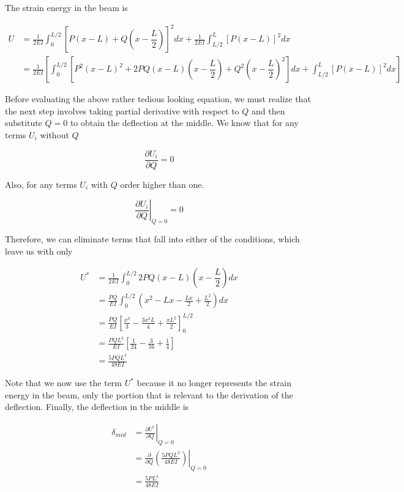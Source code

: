 \documentclass[
fontsize=10pt,
a4paper,
twosides=false,
open=any,
svgnames,
]{kaobook} %
\begin{document}
\begin{example}
    The strain energy in the beam is

    \begin{align*}
      U &= \frac{1}{2EI} \int_0^{L/2} \left[ P(x - L) + Q(x - \dfrac{L}{2}) \right]^2dx + \frac{1}{2EI} \int_{L/2}^L \left[ P(x-L) \right]^2dx \\
        &= \frac{1}{2EI} \left[ \int_0^{L/2} \left[ P^2(x-L)^2 + 2PQ(x-L)(x-\dfrac{L}{2}) + Q^2(x - \dfrac{L}{2})^2 \right] dx +  \int_{L/2}^L \left[ P(x-L) \right]^2dx \right]
    \end{align*}

    Before evaluating the above rather tedious looking equation, we must realize that the next step involves taking partial derivative with respect to $Q$ and then substitute $Q = 0$ to obtain the deflection at the middle. We know that for any terms $U_i$ without $Q$

    \begin{equation*}
      \frac{\partial U_i}{\partial Q} = 0
    \end{equation*}

    Also, for any terms $U_i$ with $Q$ order higher than one.

    \begin{equation*}
      \left. \frac{\partial U_i}{\partial Q} \right|_{Q=0} = 0
    \end{equation*}

    Therefore, we can eliminate terms that fall into either of the conditions, which leave us with only

    \begin{align*}
      U^* &= \frac{1}{2EI} \int_0^{L/2} 2PQ(x-L)(x-\dfrac{L}{2}) dx \\
          &= \frac{PQ}{EI} \int_0^{L/2} (x^2 - Lx - \frac{Lx}{2} + \frac{L^2}{2}) dx \\
          &= \frac{PQ}{EI} \left[ \frac{x^3}{3} - \frac{3x^2L}{4} + \frac{xL^2}{2} \right]_0^{L/2} \\
          &= \frac{PQL^3}{EI} \left[ \frac{1}{24} - \frac{3}{16} + \frac{1}{4} \right] \\
          &= \frac{5PQL^3}{48EI}
    \end{align*}

    Note that we now use the term $U^*$ because it no longer represents the strain energy in the beam, only the portion that is relevant to the derivation of the deflection. Finally, the deflection in the middle is

    \begin{align*}
      \delta_{mid} &= \left. \frac{\partial U^*}{\partial Q} \right|_{Q=0} \\
                   &= \left. \frac{\partial}{\partial Q} \left( \frac{5PQL^3}{48EI} \right) \right|_{Q=0} \\
                   &= \frac{5PL^3}{48EI}
    \end{align*}
\end{example}
\end{document}
